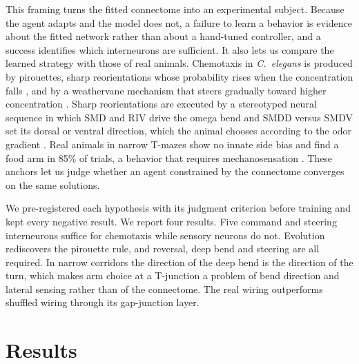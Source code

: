 \documentclass[11pt,a4paper]{article}
\newcommand{\Ce}{\textit{C.~elegans}}
\begin{document}
This framing turns the fitted connectome into an experimental subject. Because the agent adapts and the model does not, a failure to learn a behavior is evidence about the fitted network rather than about a hand-tuned controller, and a success identifies which interneurons are sufficient. It also lets us compare the learned strategy with those of real animals. Chemotaxis in \Ce{} is produced by pirouettes, sharp reorientations whose probability rises when the concentration falls \cite{r9}, and by a weathervane mechanism that steers gradually toward higher concentration \cite{r10}. Sharp reorientations are executed by a stereotyped neural sequence in which SMD and RIV drive the omega bend and SMDD versus SMDV set its dorsal or ventral direction, which the animal chooses according to the odor gradient \cite{r11}. Real animals in narrow T-mazes show no innate side bias and find a food arm in 85\% of trials, a behavior that requires mechanosensation \cite{r3}. These anchors let us judge whether an agent constrained by the connectome converges on the same solutions.

We pre-registered each hypothesis with its judgment criterion before training and kept every negative result. We report four results. Five command and steering interneurons suffice for chemotaxis while sensory neurons do not. Evolution rediscovers the pirouette rule, and reversal, deep bend and steering are all required. In narrow corridors the direction of the deep bend is the direction of the turn, which makes arm choice at a T-junction a problem of bend direction and lateral sensing rather than of the connectome. The real wiring outperforms shuffled wiring through its gap-junction layer.

\section*{Results}
\end{document}
